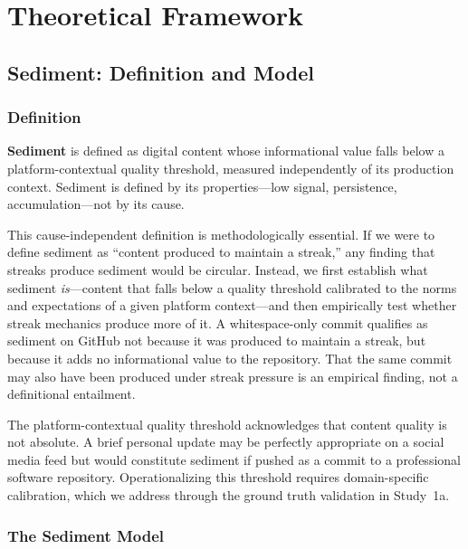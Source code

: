 \documentclass[12pt]{article}
\begin{document}
\section{Theoretical Framework}
\label{sec:theoretical-framework}

\subsection{Sediment: Definition and Model}
\label{sec:sediment-definition}

\subsubsection{Definition}
\label{sec:definition}

\textbf{Sediment} is defined as digital content whose informational value falls below a platform-contextual quality threshold, measured independently of its production context. Sediment is defined by its properties---low signal, persistence, accumulation---not by its cause.

This cause-independent definition is methodologically essential. If we were to define sediment as ``content produced to maintain a streak,'' any finding that streaks produce sediment would be circular. Instead, we first establish what sediment \emph{is}---content that falls below a quality threshold calibrated to the norms and expectations of a given platform context---and then empirically test whether streak mechanics produce more of it. A whitespace-only commit qualifies as sediment on GitHub not because it was produced to maintain a streak, but because it adds no informational value to the repository. That the same commit may also have been produced under streak pressure is an empirical finding, not a definitional entailment.

The platform-contextual quality threshold acknowledges that content quality is not absolute. A brief personal update may be perfectly appropriate on a social media feed but would constitute sediment if pushed as a commit to a professional software repository. Operationalizing this threshold requires domain-specific calibration, which we address through the ground truth validation in Study~1a.

\subsubsection{The Sediment Model}
\label{sec:sediment-model}
\end{document}
